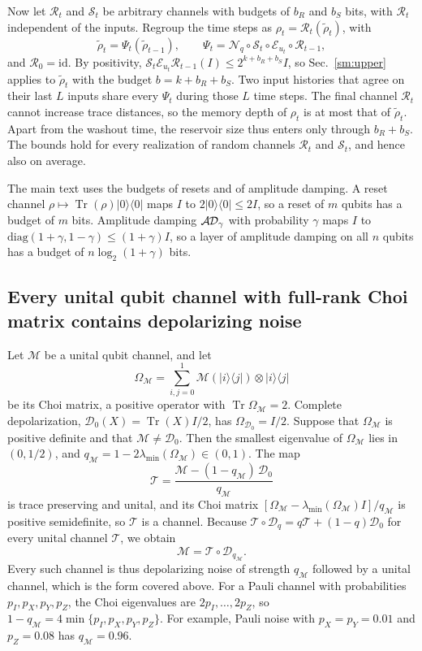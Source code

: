 \documentclass[aps,prl,twocolumn,superscriptaddress,floatfix]{revtex4-2}
\theoremstyle{plain}
\newcommand{\tr}{\operatorname{Tr}}
\newcommand{\ketbra}[2]{|#1\rangle\!\langle #2|}
\newcommand{\cD}{\mathcal D}
\newcommand{\cE}{\mathcal E}
\newcommand{\Nq}{\mathcal N_q}
\newcommand{\AD}{\mathcal{A\hspace{-0.6pt}D}}
\begin{document}
Now let $\mathcal R_t$ and $\mathcal S_t$ be arbitrary channels with budgets of $b_R$ and $b_S$ bits, with $\mathcal R_t$ independent of the inputs. Regroup the time steps as $\rho_t=\mathcal R_t(\tilde\rho_t)$, with
\begin{equation}
\tilde\rho_t=\Psi_t(\tilde\rho_{t-1}),\qquad\Psi_t=\Nq\circ\mathcal S_t\circ\cE_{u_t}\circ\mathcal R_{t-1},
\end{equation}
and $\mathcal R_0=\mathrm{id}$. By positivity, $\mathcal S_t\cE_{u_t}\mathcal R_{t-1}(I)\le2^{k+b_R+b_S}I$, so Sec.~\ref{sm:upper} applies to $\tilde\rho_t$ with the budget $b=k+b_R+b_S$. Two input histories that agree on their last $L$ inputs share every $\Psi_t$ during those $L$ time steps. The final channel $\mathcal R_t$ cannot increase trace distances, so the memory depth of $\rho_t$ is at most that of $\tilde\rho_t$. Apart from the washout time, the reservoir size thus enters only through $b_R+b_S$. The bounds hold for every realization of random channels $\mathcal R_t$ and $\mathcal S_t$, and hence also on average.

The main text uses the budgets of resets and of amplitude damping. A reset channel $\rho\mapsto\tr(\rho)\ketbra00$ maps $I$ to $2\ketbra00\le2I$, so a reset of $m$ qubits has a budget of $m$ bits. Amplitude damping $\AD_\gamma$ with probability $\gamma$ maps $I$ to $\mathrm{diag}(1+\gamma,1-\gamma)\le(1+\gamma)I$, so a layer of amplitude damping on all $n$ qubits has a budget of $n\log_2(1+\gamma)$ bits.

\subsection{Every unital qubit channel with full-rank Choi matrix contains depolarizing noise}

Let $\mathcal M$ be a unital qubit channel, and let
\[
\Omega_{\mathcal M}=\sum_{i,j=0}^1\mathcal M(\ketbra ij)\otimes\ketbra ij
\]
be its Choi matrix, a positive operator with $\tr\Omega_{\mathcal M}=2$. Complete depolarization, $\cD_0(X)=\tr(X)I/2$, has $\Omega_{\cD_0}=I/2$. Suppose that $\Omega_{\mathcal M}$ is positive definite and that $\mathcal M\ne\cD_0$. Then the smallest eigenvalue of $\Omega_{\mathcal M}$ lies in $(0,1/2)$, and $q_{\mathcal M}=1-2\lambda_{\min}(\Omega_{\mathcal M})\in(0,1)$. The map
\[
\mathcal T=\frac{\mathcal M-(1-q_{\mathcal M})\,\cD_0}{q_{\mathcal M}}
\]
is trace preserving and unital, and its Choi matrix $[\Omega_{\mathcal M}-\lambda_{\min}(\Omega_{\mathcal M})I]/q_{\mathcal M}$ is positive semidefinite, so $\mathcal T$ is a channel. Because $\mathcal T\circ\cD_q=q\mathcal T+(1-q)\cD_0$ for every unital channel $\mathcal T$, we obtain
\begin{equation}
\mathcal M=\mathcal T\circ\cD_{q_{\mathcal M}} .
\end{equation}
Every such channel is thus depolarizing noise of strength $q_{\mathcal M}$ followed by a unital channel, which is the form covered above. For a Pauli channel with probabilities $p_I,p_X,p_Y,p_Z$, the Choi eigenvalues are $2p_I,\dots,2p_Z$, so $1-q_{\mathcal M}=4\min\{p_I,p_X,p_Y,p_Z\}$. For example, Pauli noise with $p_X=p_Y=0.01$ and $p_Z=0.08$ has $q_{\mathcal M}=0.96$.
\end{document}
